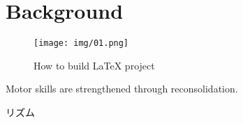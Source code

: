 \documentclass[../main.tex]{subfiles}
\begin{document}
\setcounter{section}{1}
\section{Background}

\begin{figure}[ht]
    \begin{center}
        \texttt{[image: img/01.png]}
        \caption{How to build LaTeX project}
        \label{img:test}
    \end{center}
\end{figure}

\blindtext

Motor skills are strengthened through reconsolidation. \cite{Wymbs2016} %

リズム \cite*{伊藤宏司1993歩行運動とリズム生成}
\end{document}
